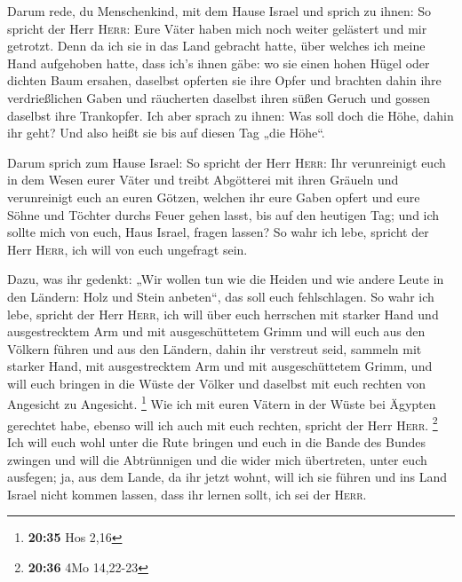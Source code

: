  Darum rede, du Menschenkind, mit dem Hause Israel und
sprich zu ihnen: So spricht der Herr \textsc{Herr}: Eure Väter haben
mich noch weiter gelästert und mir getrotzt.  Denn da ich
sie in das Land gebracht hatte, über welches ich meine Hand aufgehoben
hatte, dass ich's ihnen gäbe: wo sie einen hohen Hügel oder dichten Baum
ersahen, daselbst opferten sie ihre Opfer und brachten dahin ihre
verdrießlichen Gaben und räucherten daselbst ihren süßen Geruch und
gossen daselbst ihre Trankopfer.  Ich aber sprach zu
ihnen: Was soll doch die Höhe, dahin ihr geht? Und also heißt sie bis
auf diesen Tag „die Höhe``.

 Darum sprich zum Hause Israel: So spricht der Herr
\textsc{Herr}: Ihr verunreinigt euch in dem Wesen eurer Väter und treibt
Abgötterei mit ihren Gräueln  und verunreinigt euch an
euren Götzen, welchen ihr eure Gaben opfert und eure Söhne und Töchter
durchs Feuer gehen lasst, bis auf den heutigen Tag; und ich sollte mich
von euch, Haus Israel, fragen lassen? So wahr ich lebe, spricht der Herr
\textsc{Herr}, ich will von euch ungefragt sein.

 Dazu, was ihr gedenkt: „Wir wollen tun wie die Heiden
und wie andere Leute in den Ländern: Holz und Stein anbeten``, das soll
euch fehlschlagen.  So wahr ich lebe, spricht der Herr
\textsc{Herr}, ich will über euch herrschen mit starker Hand und
ausgestrecktem Arm und mit ausgeschüttetem Grimm  und
will euch aus den Völkern führen und aus den Ländern, dahin ihr
verstreut seid, sammeln mit starker Hand, mit ausgestrecktem Arm und mit
ausgeschüttetem Grimm,  und will euch bringen in die
Wüste der Völker und daselbst mit euch rechten von Angesicht zu
Angesicht. \footnote{\textbf{20:35} Hos 2,16}  Wie ich
mit euren Vätern in der Wüste bei Ägypten gerechtet habe, ebenso will
ich auch mit euch rechten, spricht der Herr \textsc{Herr}. \footnote{\textbf{20:36}
  4Mo 14,22-23}  Ich will euch wohl unter die Rute
bringen und euch in die Bande des Bundes zwingen  und
will die Abtrünnigen und die wider mich übertreten, unter euch ausfegen;
ja, aus dem Lande, da ihr jetzt wohnt, will ich sie führen und ins Land
Israel nicht kommen lassen, dass ihr lernen sollt, ich sei der
\textsc{Herr}.

